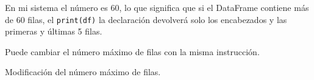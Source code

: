 En mi sistema el número es 60, lo que significa que si el DataFrame
contiene más de 60 filas, el \texttt{print(df)} la declaración devolverá
solo los encabezados y las primeras y últimas 5 filas.

Puede cambiar el número máximo de filas con la misma instrucción.\\

\begin{code} Modificación del número máximo de filas.
\begin{Shaded}
\begin{Highlighting}[]

\OperatorTok{=} 
\OperatorTok{=}\NormalTok{)}

\end{Highlighting}
\end{Shaded}


\end{code}
